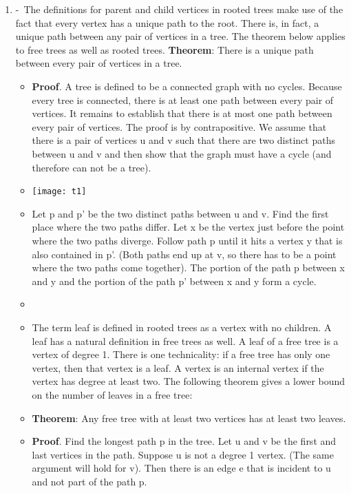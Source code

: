 \documentclass[12pt,a4paper]{article}
\begin{document}
\begin{enumerate}
\begin{itemize}
  \end{itemize} 
  \item {} -\ The definitions for parent and child vertices in rooted trees make use of the fact that every vertex has a unique path to the root. There is, in fact, a unique path between any pair of vertices in a tree. The theorem below applies to free trees as well as rooted trees.
  \textbf{Theorem}: There is a unique path between every pair of vertices in a tree.
  \begin{itemize}
    \item \textbf{Proof}. A tree is defined to be a connected graph with no cycles. Because every tree is connected, there is at least one path between every pair of vertices. It remains to establish that there is at most one path between every pair of vertices. The proof is by contrapositive. We assume that there is a pair of vertices u and v such that there are two distinct paths between u and v and then show that the graph must have a cycle (and therefore can not be a tree).
    \item[] \texttt{[image: t1]}
    \item Let p and p' be the two distinct paths between u and v. Find the first place where the two paths differ. Let x be the vertex just before the point where the two paths diverge. Follow path p until it hits a vertex y that is also contained in p'. (Both paths end up at v, so there has to be a point where the two paths come together). The portion of the path p between x and y and the portion of the path p' between x and y form a cycle. 
    \item[]
    \item The term leaf is defined in rooted trees as a vertex with no children. A leaf has a natural definition in free trees as well. A leaf of a free tree is a vertex of degree 1. There is one technicality: if a free tree has only one vertex, then that vertex is a leaf. A vertex is an internal vertex if the vertex has degree at least two. The following theorem gives a lower bound on the number of leaves in a free tree:
    \item[] \textbf{Theorem}: Any free tree with at least two vertices has at least two leaves.
    \item \textbf{Proof}. Find the longest path p in the tree. Let u and v be the first and last vertices in the path. Suppose u is not a degree 1 vertex. (The same argument will hold for v). Then there is an edge e that is incident to u and not part of the path p.

\end{itemize}
\end{enumerate}
\end{document}
